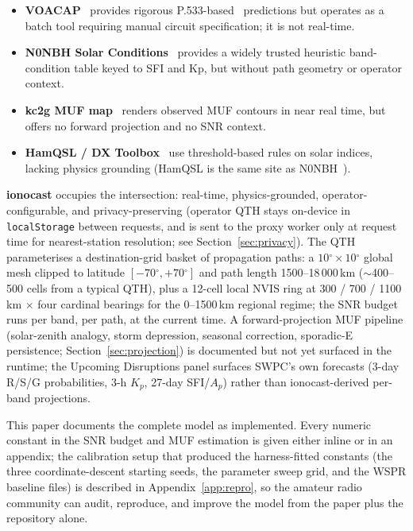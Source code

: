 \documentclass[11pt,a4paper]{article}
\newcommand{\degree}{\ensuremath{{}^\circ}}
\begin{document}
\begin{itemize}[nosep]
  \item \textbf{VOACAP}~\cite{voacap} provides rigorous
        P.533-based~\cite{itup533} predictions but operates as a
        batch tool requiring manual circuit specification; it is
        not real-time.
  \item \textbf{N0NBH Solar Conditions}~\cite{n0nbh} provides a
        widely trusted heuristic band-condition table keyed to
        SFI and Kp, but without path geometry or operator context.
  \item \textbf{kc2g MUF map}~\cite{kc2g} renders observed MUF
        contours in near real time, but offers no forward
        projection and no SNR context.
  \item \textbf{HamQSL / DX Toolbox}~\cite{dxtoolbox} use
        threshold-based rules on solar indices, lacking physics
        grounding (HamQSL is the same site as
        N0NBH~\cite{n0nbh}).
\end{itemize}

\textbf{ionocast} occupies the intersection: real-time, physics-grounded,
operator-configurable, and privacy-preserving (operator QTH stays
on-device in \texttt{localStorage} between requests, and is sent
to the proxy worker only at request time for nearest-station
resolution; see Section~\ref{sec:privacy}).  The QTH parameterises
a destination-grid basket of propagation paths: a $10\degree \times
10\degree$ global mesh clipped to latitude $[-70\degree,
+70\degree]$ and path length 1500--18\,000\,km (${\sim}$400--500
cells from a typical QTH), plus a 12-cell local NVIS ring at 300 /
700 / 1100\,km $\times$ four cardinal bearings for the 0--1500\,km
regional regime; the SNR budget runs per band, per path,
at the current time.  A forward-projection MUF pipeline (solar-zenith
analogy, storm depression, seasonal correction, sporadic-E
persistence; Section~\ref{sec:projection}) is documented but not
yet surfaced in the runtime; the Upcoming Disruptions panel
surfaces SWPC's own forecasts (3-day R/S/G probabilities, 3-h
$K_p$, 27-day SFI/$A_p$) rather than ionocast-derived per-band
projections.

This paper documents the complete model as implemented.  Every
numeric constant in the SNR budget and MUF estimation is given
either inline or in an appendix; the calibration setup that
produced the harness-fitted constants (the three coordinate-descent
starting seeds, the parameter sweep grid, and the WSPR baseline
files) is described in Appendix~\ref{app:repro}, so the amateur
radio community can audit, reproduce, and improve the model from
the paper plus the repository alone.
\end{document}
